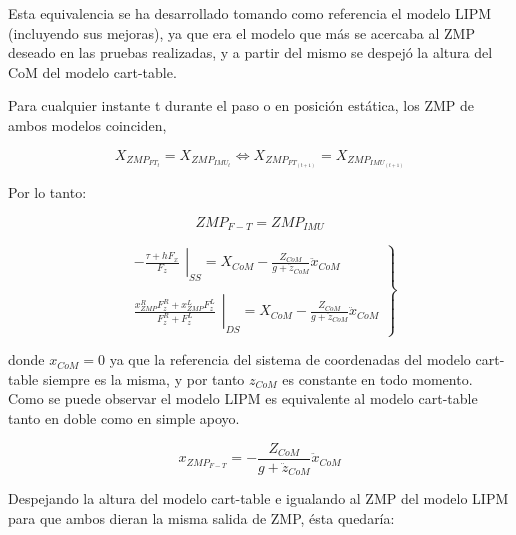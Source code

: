 Esta equivalencia se ha desarrollado tomando como referencia el modelo LIPM (incluyendo sus mejoras), ya que era el modelo que más se acercaba al ZMP deseado en las pruebas realizadas, y a partir del mismo se despejó la altura del CoM del modelo cart-table. 


Para cualquier instante t durante el paso o en posición estática, los ZMP de ambos modelos coinciden,

\begin{equation}
X_{ZMP_{FT_t}} = X_{ZMP_{IMU_t}} \Leftrightarrow   X_{ZMP_{FT_{(t+1)}}}=X_{ZMP_{IMU_{(t+1)}}}
\label{ec428}
\end{equation}

Por lo tanto:

\begin{equation}
ZMP_{F-T}=ZMP_{IMU}
\label{ec429}
\end{equation}

\begin{equation}
\left.\begin{matrix}
\left.\begin{matrix}
-\frac{\tau+ h F_{x}}{F_{z}}
\end{matrix}\right|_{SS}=X_{CoM}-\frac{Z_{CoM}}{g+\ddot{z}_{CoM}}\ddot{x}_{CoM}
\\ 
\\
\left.\begin{matrix}
\frac{x_{ZMP}^{R}F_{z}^{R}+x_{ZMP}^{L}F_{z}^{L}}{F_{z}^{R}+F_{z}^{L}}
\end{matrix}\right|_{DS}=X_{CoM}-\frac{Z_{CoM}}{g+\ddot{z}_{CoM}}\ddot{x}_{CoM}
\end{matrix}\right\}
\label{ec430}
\end{equation}

donde $x_{CoM}=0$ ya que la referencia del sistema de coordenadas del modelo cart-table siempre es la misma, y por tanto $z_{CoM}$ es constante en todo momento. Como se puede observar el modelo LIPM es equivalente al modelo cart-table tanto en doble como en simple apoyo.

\begin{equation}
x_{ZMP_{F-T}}=-\frac{Z_{CoM}}{g+\ddot{z}_{CoM}}\ddot{x}_{CoM}
\label{ec431}
\end{equation}

Despejando la altura del modelo cart-table e igualando al ZMP del modelo LIPM para que ambos dieran la misma salida de ZMP, ésta quedaría:

